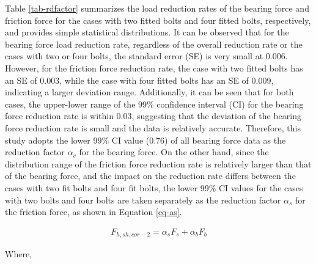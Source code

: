 Table \ref{tab-rdfactor} summarizes the load reduction rates of the bearing force and friction force for the cases with two fitted bolts and four fitted bolts, respectively, and provides simple statistical distributions. It can be observed that for the bearing force load reduction rate, regardless of the overall reduction rate or the cases with two or four bolts, the standard error (SE) is very small at 0.006. However, for the friction force reduction rate, the case with two fitted bolts has an SE of 0.003, while the case with four fitted bolts has an SE of 0.009, indicating a larger deviation range. Additionally, it can be seen that for both cases, the upper-lower range of the 99\% confidence interval (CI) for the bearing force reduction rate is within 0.03, suggesting that the deviation of the bearing force reduction rate is small and the data is relatively accurate. Therefore, this study adopts the lower 99\% CI value (0.76) of all bearing force data as the reduction factor $\alpha_v$ for the bearing force. On the other hand, since the distribution range of the friction force reduction rate is relatively larger than that of the bearing force, and the impact on the reduction rate differs between the cases with two fit bolts and four fit bolts, the lower 99\% CI values for the cases with two bolts and four bolts are taken separately as the reduction factor $\alpha_s$ for the friction force, as shown in Equation \ref{eq-as}.



\begin{equation}
    \begin{aligned}
        F_{h,sh,cor-2} = \alpha_s F_s+\alpha_{b} F_b
    \end{aligned}
    \label{eq-pvh-2}
\end{equation}

Where,

